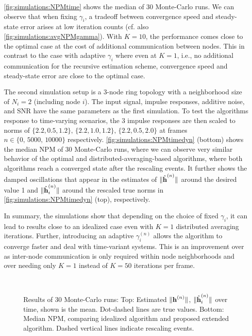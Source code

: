 \documentclass{article}
\begin{document}
\autoref{fig:simulations:NPMtime} shows the median of 30 Monte-Carlo runs.
We can observe that when fixing \(\gamma_i\), a tradeoff between convergence speed and steady-state error arises at low iteration counts (cf. also \autoref{fig:simulations:avgNPMgamma}).
With \(K=10\), the performance comes close to the optimal case at the cost of additional communication between nodes.
This in contrast to the case with adaptive \(\gamma_i\) where even at \(K=1\), i.e., no additional communication for the recursive estimation scheme, convergence speed and steady-state error are close to the optimal case.

The second simulation setup is a \(3\)-node ring topology with a neighborhood size of \(N_i=2\) (including node \(i\)).
The input signal, impulse responses, additive noise, and SNR have the same parameters as the first simulation.
To test the algorithms response to time-varying scenarios, the 3 impulse responses are then scaled to norms of \(\{2.2, 0.5, 1.2\},\, \{2.2, 1.0, 1.2\},\, \{2.2, 0.5, 2.0\}\) at frames \(n \in \{0,\, 5000,\, 10000\}\) respectively.
\autoref{fig:simulations:NPMtimedyn} (bottom) shows the median NPM of 30 Monte-Carlo runs, where we can observe very similar behavior of the optimal and distributed-averaging-based algorithms, where both algorithms reach a converged state after the rescaling events.
It further shows the damped oscillations that appear in the estimates of \(\|\hat{\bm{\mathrm{h}}}^{(n)}\|\) around the desired value 1 and \(\|\hat{\bm{\mathrm{h}}}_i^{(n)}\|\) around the rescaled true norms in \autoref{fig:simulations:NPMtimedyn} (top), respectively.

In summary, the simulations show that depending on the choice of fixed \(\gamma_i\), it can lead to results close to an idealized case even with \(K=1\) distributed averaging iterations.
Further, introducing an adaptive \(\gamma_i^{(n)}\) allows the algorithm to converge faster and deal with time-variant systems.
This is an improvement over \cite{blochbergerDBSI} as inter-node communication is only required within node neighborhoods and over \cite{yuDistributedBlindSystem2014, liuDistributedBlindIdentification2016} needing only \(K=1\) instead of \(K=50\) iterations per frame.

\begin{figure}[t]
    \centering
    \\\vspace*{-1.2cm}
    
    \vspace*{-0.6cm}
    \caption[]{Results of 30 Monte-Carlo runs: Top: Estimated \(\|\bm{\mathrm{h}}^{(n)}\|\), \(\|\hat{\bm{\mathrm{h}}}_i^{(n)}\|\) over time, shown is the mean. Dot-dashed lines are true values. Bottom: Median NPM, comparing idealized algorithm and proposed extended algorithm. Dashed vertical lines indicate rescaling events.}
    \label{fig:simulations:NPMtimedyn}
\end{figure}
\end{document}
